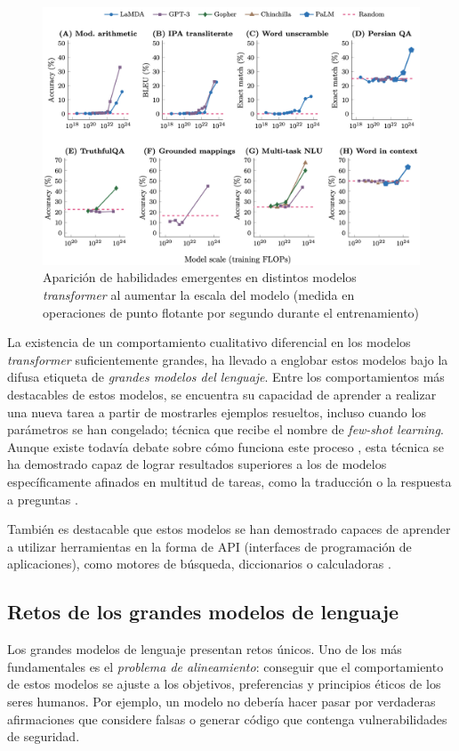 \begin{figure}[tb]
    \centering
    \includegraphics[width=\textwidth]{figures/chapter3/emergent.png}
    \caption{Aparición de habilidades emergentes en distintos modelos \textit{transformer} al aumentar la escala del modelo (medida en operaciones de punto flotante por segundo durante el entrenamiento) \cite{wei2022emergent}}
    \label{fig:emergent}
\end{figure}

La existencia de un comportamiento cualitativo diferencial en los modelos \textit{transformer} suficientemente grandes, ha llevado a englobar estos modelos bajo la difusa etiqueta de \textit{grandes modelos del lenguaje}. Entre los comportamientos más destacables de estos modelos, se encuentra su capacidad de aprender a realizar una nueva tarea a partir de mostrarles ejemplos resueltos, incluso cuando los parámetros se han congelado; técnica que recibe el nombre de \textit{few-shot learning}. Aunque existe todavía debate sobre cómo funciona este proceso \cite{xie2021explanation,dai2022can}, esta técnica se ha demostrado capaz de lograr resultados superiores a los de modelos específicamente afinados en multitud de tareas, como la traducción o la respuesta a preguntas \cite{brown2020language}.

También es destacable que estos modelos se han demostrado capaces de aprender a utilizar herramientas en la forma de API (interfaces de programación de aplicaciones), como motores de búsqueda, diccionarios o calculadoras \cite{schick2023toolformer}.

\subsection{Retos de los grandes modelos de lenguaje}
Los grandes modelos de lenguaje presentan retos únicos. Uno de los más fundamentales es el \textit{problema de alineamiento}: conseguir que el comportamiento de estos modelos se ajuste a los objetivos, preferencias y principios éticos de los seres humanos. Por ejemplo, un modelo no debería hacer pasar por verdaderas afirmaciones que considere falsas o generar código que contenga vulnerabilidades de seguridad.

